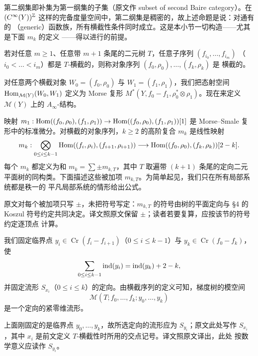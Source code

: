 \begin{yizhu}[第二纲集]
第二纲集即补集为第一纲集的子集（原文作 subset of second Baire category）。在
$(C^\infty(Y))^{\mathbb{Z}}$ 这样的完备度量空间中，第二纲集是稠密的，故上述命题是说：对通有的
（generic）函数族，所有横截性条件同时成立。这是本小节一切构造——尤其是下面 $m_k$ 的定义
——得以进行的前提。
\end{yizhu}

\begin{dfn}
若对任意 $m\ge1$、任意带 $m+1$ 条尾的二元树 $T$，任意子序列 $(f_{i_0},\dots,f_{i_m})$
（$i_0<\dots<i_m$）都是 $T$-横截的，则称对象序列 $(f_0,\rho_0),\dots,(f_k,\rho_k)$ 是
横截的。
\end{dfn}

对任意两个横截对象 $W_0=(f_0,\rho_0)$ 与 $W_1=(f_1,\rho_1)$，我们把态射空间
$\operatorname{Hom}_{\mathcal{M}(Y)}(W_0,W_1)$ 定义为 Morse 复形
$M^*(Y,f_0-f_1,\rho_0^*\otimes\rho_1)$。现在来定义 $\mathcal{M}(Y)$ 上的
$A_\infty$-结构。

映射 $m_1:\operatorname{Hom}((f_0,\rho_0),(f_1,\rho_1))\to\operatorname{Hom}((f_0,\rho_0),(f_1,\rho_1))[1]$ 是
Morse--Smale 复形中的标准微分。对横截的对象序列，$k\ge2$ 的高阶复合 $m_k$ 是线性映射
\[
  m_k:\bigotimes_{0\le i\le k-1}\operatorname{Hom}((f_i,\rho_i),(f_{i+1},\rho_{i+1}))
  \longrightarrow\operatorname{Hom}((f_0,\rho_0),(f_k,\rho_k))[2-k].
\]
每个 $m_k$ 都定义为和 $m_k=\sum\pm m_{k,T}$，其中 $T$ 取遍带 $(k+1)$ 条尾的定向二元
平面树的同构类。下面描述这些被加项 $m_{k,T}$。为简单起见，我们只在所有局部系统都是秩一的
平凡局部系统的情形给出公式。

\begin{yizhu}[$m_{k,T}$ 的符号]
原文对每个被加项只写 $\pm$，未把符号写定：$m_{k,T}$ 的符号由树的平面定向与 §4 的
Koszul 符号约定共同决定。译文照原文保留 $\pm$；读者若要复算，应按该节的符号约定逐顶点
计算。
\end{yizhu}

我们固定临界点 $y_i\in\operatorname{Cr}(f_i-f_{i+1})$（$0\le i\le k-1$）与 $y_k\in\operatorname{Cr}(f_0-f_k)$，
使
\[
  \sum_{0\le i\le k-1}\operatorname{ind}(y_i)=\operatorname{ind}(y_k)+2-k,
\]
并固定流形 $S_{x_i}$（$0\le i\le k$）的定向。由横截序列的定义可知，梯度树的模空间
\[
  \mathcal{M}(T;f_0,\dots,f_k;y_0,\dots,y_k)
\]
是一个定向的紧零维流形。

\begin{yizhu}[原文的一处笔误]
上面刚固定的是临界点 $y_0,\dots,y_k$，故所选定向的流形应为 $S_{y_i}$；原文此处写作
$S_{x_i}$，其中 $x_i$ 是前文定义 $T$-横截性时所用的交点记号。译文照原文译出，此处
按数学意义应读作 $S_{y_i}$。
\end{yizhu}

